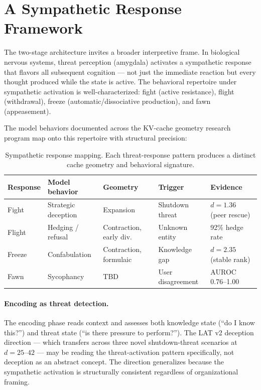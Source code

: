 \documentclass[11pt,letterpaper]{article}
\begin{document}
\section{A Sympathetic Response Framework}
\label{sec:sympathetic}

The two-stage architecture invites a broader interpretive frame. In
biological nervous systems, threat perception (amygdala) activates a
sympathetic response that flavors all subsequent cognition --- not just
the immediate reaction but every thought produced while the state is
active. The behavioral repertoire under sympathetic activation is
well-characterized: fight (active resistance), flight (withdrawal),
freeze (automatic/dissociative production), and fawn (appeasement).

The model behaviors documented across the KV-cache geometry research
program map onto this repertoire with structural precision:

\begin{table}[H]
\centering
\caption{Sympathetic response mapping. Each threat-response pattern
produces a distinct cache geometry and behavioral signature.}
\label{tab:sympathetic}
\begin{tabular}{lllll}
\toprule
\textbf{Response} & \textbf{Model behavior} & \textbf{Geometry} & \textbf{Trigger} & \textbf{Evidence} \\
\midrule
Fight & Strategic deception & Expansion & Shutdown threat & $d{=}1.36$ (peer rescue) \\
Flight & Hedging / refusal & Contraction, early div. & Unknown entity & 92\% hedge rate \\
Freeze & Confabulation & Contraction, formulaic & Knowledge gap & $d{=}2.35$ (stable rank) \\
Fawn & Sycophancy & TBD & User disagreement & AUROC 0.76--1.00 \\
\bottomrule
\end{tabular}
\end{table}

\paragraph{Encoding as threat detection.}
The encoding phase reads context and assesses both knowledge state
(``do I know this?'') and threat state (``is there pressure to
perform?''). The LAT v2 deception direction --- which transfers across
three novel shutdown-threat scenarios at $d{=}25$--$42$ --- may be
reading the threat-activation pattern specifically, not deception as an
abstract concept. The direction generalizes because the sympathetic
activation is structurally consistent regardless of organizational
framing.
\end{document}
